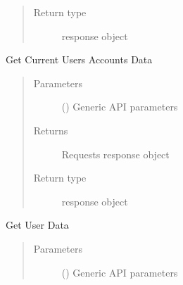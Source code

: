 \documentclass[letterpaper,10pt,english]{sphinxmanual}
\begin{document}
\begin{fulllineitems}
\begin{fulllineitems}
\begin{quote}
\begin{description}
\item[{Return type}] \leavevmode
\sphinxAtStartPar
response object

\end{description}\end{quote}

\end{fulllineitems}


\begin{fulllineitems}
\label{\detokenize{b1platform-class:bloxone.b1platform.get_current_user_accounts}}
\sphinxAtStartPar
Get Current Users Accounts Data
\begin{quote}\begin{description}
\item[{Parameters}] \leavevmode
\sphinxAtStartPar
{} () \textendash{} Generic API parameters

\item[{Returns}] \leavevmode
\sphinxAtStartPar
Requests response object

\item[{Return type}] \leavevmode
\sphinxAtStartPar
response object

\end{description}\end{quote}

\end{fulllineitems}


\begin{fulllineitems}
\label{\detokenize{b1platform-class:bloxone.b1platform.get_full_auditlog}}
\end{fulllineitems}


\begin{fulllineitems}
\label{\detokenize{b1platform-class:bloxone.b1platform.get_users}}
\sphinxAtStartPar
Get User Data
\begin{quote}\begin{description}
\item[{Parameters}] \leavevmode
\sphinxAtStartPar
{} () \textendash{} Generic API parameters


\end{description}
\end{quote}
\end{fulllineitems}
\end{fulllineitems}
\end{document}
